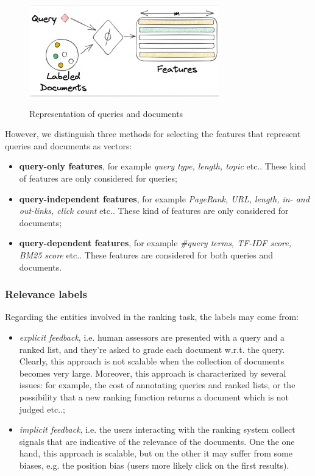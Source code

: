 \begin{figure}[h!]
		\centering
		\includegraphics[scale = 2.0]{img/ranking representation.jpg}
        \label{ranking repr}
        \caption{Representation of queries and documents}
\end{figure}

However, we distinguish three methods for selecting the features that represent queries and documents as vectors:

\begin{itemize}
    \item \textbf{query-only features}, for example \textit{query type, length, topic} etc.. These kind of features are only considered for queries;
    \item \textbf{query-independent features}, for example \textit{PageRank, URL, length, in- and out-links, click count} etc.. These kind of features are only considered for documents;
    \item \textbf{query-dependent features}, for example \textit{#query terms, TF-IDF score, BM25 score} etc.. These features are considered for both queries and documents.
\end{itemize}

\subsubsection{Relevance labels}
Regarding the entities involved in the ranking task, the labels may come from:

\begin{itemize}
    \item \textit{explicit feedback}, i.e. human assessors are presented with a query and a ranked list, and they're asked to grade each document w.r.t. the query. Clearly, this approach is not scalable when the collection of documents becomes very large. Moreover, this approach is characterized by several issues: for example, the cost of annotating queries and ranked lists, or the possibility that a new ranking function returns a document which is not judged etc..;
    \item \textit{implicit feedback}, i.e. the users interacting with the ranking system collect signals that are indicative of the relevance of the documents. One the one hand, this approach is scalable, but on the other it may suffer from some biases, e.g. the position bias (users more likely click on the first results). 
\end{itemize}

